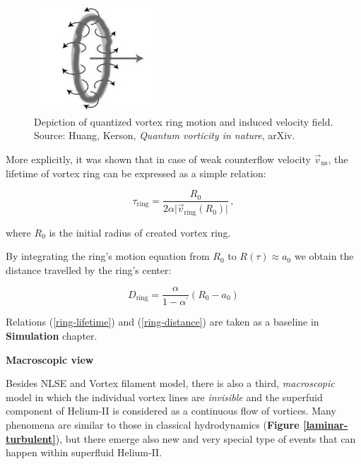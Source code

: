 \begin{figure}[h]
	\centering
	\includegraphics[width=0.4\textwidth]{graphics/theory/vortex-ring}
	\caption{Depiction of quantized vortex ring motion and induced velocity field. Source: Huang, Kerson, \textit{Quantum vorticity in nature}, arXiv.}
	\label{vortex-ring}
\end{figure}

More explicitly, it was shown \cite{donnelly_book} that in case of weak counterflow velocity $\vec{v}_{\text{ns}}$, the lifetime of vortex ring can be expressed as a simple relation:

\begin{equation}
\tau_{\text{ring}} = \frac{R_0}{2 \alpha \vert \vec{v}_{\text{ring}}(R_0)\vert}\,,
\label{ring-lifetime}
\end{equation}

where $R_0$ is the initial radius of created vortex ring.

By integrating the ring's motion equation from $R_0$ to $R(\tau) \approx a_0$ we obtain the distance travelled by the ring's center:

\begin{equation}
D_{\text{ring}} = \frac{\alpha}{1 - \alpha^{\prime}} (R_0 - a_0)
\label{ring-distance}
\end{equation}

Relations (\ref{ring-lifetime}) and (\ref{ring-distance}) are taken as a baseline in \textbf{Simulation} chapter.
\newpage


{\Huge \bfseries Macroscopic view}
\vspace{0.3cm}

Besides NLSE and Vortex filament model, there is also a third, \textit{macroscopic} model in which the individual vortex lines are \textit{invisible} and the superfuid component of Helium-II is considered as a continuous flow of vortices. Many phenomena are similar to those in classical hydrodynamics (\textbf{Figure \ref{laminar-turbulent}}), but there emerge also new and very special type of events that can happen within superfluid Helium-II.

